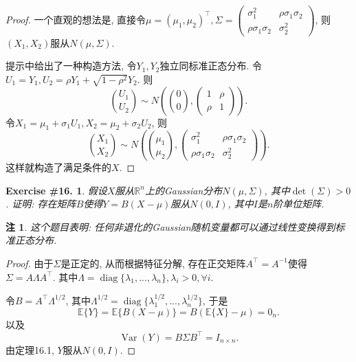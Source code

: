 \documentclass[UTF8, a4paper]{article}
\newtheorem{exercise}{Exercise \#16.}
\newtheorem*{remark}{注}
\begin{document}
\begin{proof}
一个直观的想法是, 直接令\(\mu = (\mu_1, \mu_2)^\top, \Sigma = \left(\begin{array}{cc}
    \sigma_1^2 & \rho \sigma_1 \sigma_2 \\
    \rho \sigma_1 \sigma_2 & \sigma_2^2
\end{array}\right)\), 则\((X_1, X_2)\)服从\(N(\mu, \Sigma)\).

提示中给出了一种构造方法, 令\(Y_1, Y_2\)独立同标准正态分布. 令\(U_1 = Y_1,  U_2 = \rho Y_1 + \sqrt{1 -\rho^2} Y_2\).
则 
$$
\binom{U_1}{U_2} \sim N\left(\binom{0}{0}, \left(\begin{array}{cc}
    1 & \rho \\
    \rho & 1
\end{array}\right)\right).
$$
令\(X_1 = \mu_1 + \sigma_1 U_1, X_2 = \mu_2 + \sigma_2 U_2\), 则
$$
\binom{X_1}{X_2} \sim N\left(\binom{\mu_1}{\mu_2}, \left(\begin{array}{cc}
    \sigma_1^2 & \rho \sigma_1 \sigma_2 \\
    \rho \sigma_1 \sigma_2 & \sigma_2^2
\end{array}\right)\right).
$$
这样就构造了满足条件的\(X\).
\end{proof}



\begin{framed}
\begin{exercise}
假设\(X\)服从\(\mathbb{R}^n\)上的Gaussian分布\(N(\mu, \Sigma)\), 其中\(\det(\Sigma) > 0\).
证明: 存在矩阵\(B\)使得\(Y = B(X - \mu)\)服从\(N(0, I)\), 其中\(I\)是\(n\)阶单位矩阵.
\end{exercise}
\end{framed}

\begin{remark}
这个题目表明: 任何非退化的Gaussian随机变量都可以通过线性变换得到标准正态分布.
\end{remark}

\begin{proof}
由于\(\Sigma\)是正定的, 从而根据特征分解, 存在正交矩阵\(A^\top = A^{-1}\)使得\(\Sigma = A \Lambda A^\top\).
其中\(\Lambda = \operatorname{diag}\{\lambda_1, ..., \lambda_n\}, \lambda_i > 0, \forall i\). 

令\(B = A^\top \Lambda^{1/2}\), 其中\(\Lambda^{1/2} = \operatorname{diag}\{\lambda_1^{1/2}, ..., \lambda_n^{1/2}\}\), 于是 
$$
\mathbb{E}\{Y\} = \mathbb{E}\{B(X - \mu)\} = B(\mathbb{E}\{X\} - \mu) = 0_{n}. 
$$
以及
$$
\operatorname{Var}(Y) = B \Sigma B^\top = I_{n\times n}.
$$
由定理16.1, \(Y\)服从\(N(0, I)\).
\end{proof}
\end{document}
